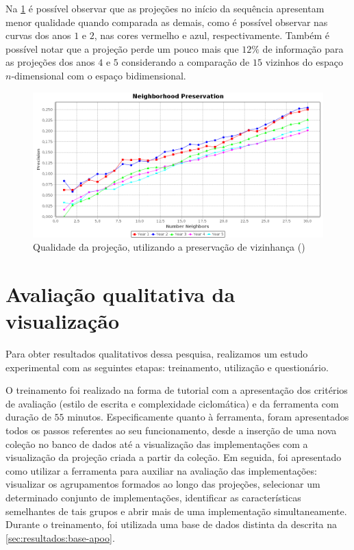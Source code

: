 	Na \cref{fig:neighborhoodAPOO30} é possível observar que as projeções no início da
	sequência apresentam menor qualidade quando comparada as demais, como é possível observar
	nas curvas dos anos $1$ e $2$, nas cores vermelho e azul, respectivamente. Também é
	possível notar que a projeção perde um pouco mais que $12\%$ de informação para as
	projeções dos anos $4$ e $5$ considerando a comparação de $15$ vizinhos do espaço
	$n$-dimensional com o espaço bidimensional.
	
	
	\begin{figure}
		\centering
		\includegraphics[width=0.7\linewidth]{imagem/neighborhoodAPOO30}
		\caption{Qualidade da projeção, utilizando a preservação de vizinhança ()}
		\label{fig:neighborhoodAPOO30}
	\end{figure}	

	
	\section{Avaliação qualitativa da visualização}
	
		Para obter resultados qualitativos dessa pesquisa, realizamos um estudo experimental com
		as seguintes etapas: treinamento, utilização e questionário.
		
		
		O treinamento foi realizado na forma de tutorial com a apresentação dos critérios
		de avaliação (estilo de escrita e complexidade ciclomática) e da ferramenta com
		duração de $55$ minutos. Especificamente quanto à ferramenta, foram apresentados
		todos os passos referentes ao seu funcionamento, desde a inserção de uma nova
		coleção no banco de dados até a visualização das implementações com a visualização
		da projeção criada a partir da coleção. Em seguida, foi apresentado como utilizar
		a ferramenta para auxiliar na avaliação das implementações: visualizar os
		agrupamentos formados ao longo das projeções, selecionar um determinado conjunto
		de implementações, identificar as características semelhantes de tais grupos e
		abrir mais de uma implementação simultaneamente. Durante o treinamento, foi utilizada uma
		base de dados distinta da descrita na \cref{sec:resultados:base-apoo}.
		
